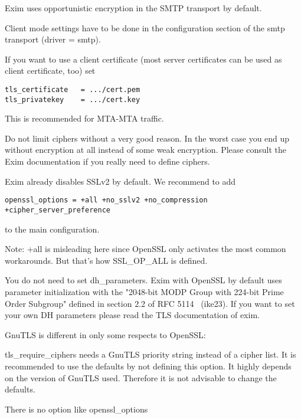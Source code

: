Exim uses opportunistic encryption in the SMTP transport by default.

Client mode settings have to be done in the configuration section of the smtp transport (driver = smtp).

If you want to use a client certificate (most server certificates can be used as client certificate, too) set
\begin{lstlisting}
tls_certificate   = .../cert.pem
tls_privatekey    = .../cert.key
\end{lstlisting}
This is recommended for MTA-MTA traffic.

Do not limit ciphers without a very good reason. In the worst case you end up without encryption at all instead of some weak encryption. Please consult the Exim documentation if you really need to define ciphers.

Exim already disables SSLv2 by default. We recommend to add
\begin{lstlisting}
openssl_options = +all +no_sslv2 +no_compression +cipher_server_preference
\end{lstlisting}
to the main configuration.

Note: +all is misleading here since OpenSSL only activates the most common workarounds. But that's how SSL\_OP\_ALL is defined.

You do not need to set dh\_parameters. Exim with OpenSSL by default uses parameter initialization with the "2048-bit MODP Group with 224-bit Prime Order Subgroup" defined in section 2.2 of RFC 5114~\cite{rfc5114} (ike23).
If you want to set your own DH parameters please read the TLS documentation of exim.


GnuTLS is different in only some respects to OpenSSL:
\begin{itemize*}
  \item tls\_require\_ciphers needs a GnuTLS priority string instead of a cipher list. It is recommended to use the defaults by not defining this option. It highly depends on the version of GnuTLS used. Therefore it is not advisable to change the defaults.
  \item There is no option like openssl\_options
\end{itemize*}

